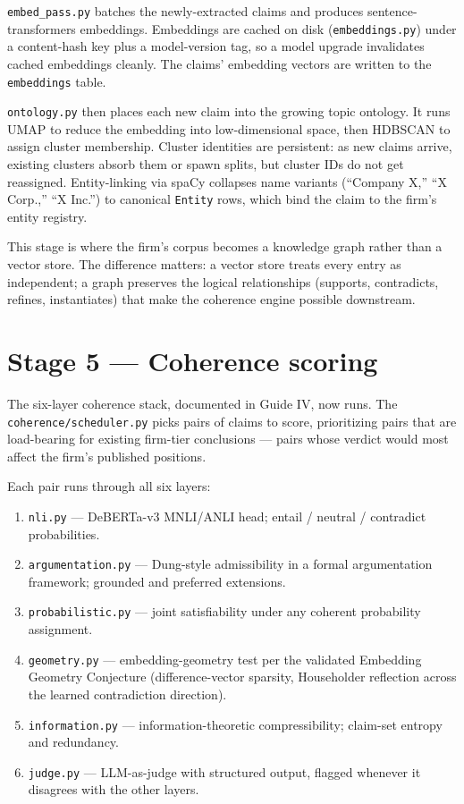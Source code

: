 \documentclass[11pt,letterpaper]{article}
\newcommand{\file}[1]{\texttt{#1}}
\begin{document}
\file{embed\_pass.py} batches the newly-extracted claims and produces sentence-transformers embeddings. Embeddings are cached on disk (\file{embeddings.py}) under a content-hash key plus a model-version tag, so a model upgrade invalidates cached embeddings cleanly. The claims' embedding vectors are written to the \texttt{embeddings} table.

\file{ontology.py} then places each new claim into the growing topic ontology. It runs UMAP to reduce the embedding into low-dimensional space, then HDBSCAN to assign cluster membership. Cluster identities are persistent: as new claims arrive, existing clusters absorb them or spawn splits, but cluster IDs do not get reassigned. Entity-linking via spaCy collapses name variants (``Company X,'' ``X Corp.,'' ``X Inc.'') to canonical \texttt{Entity} rows, which bind the claim to the firm's entity registry.

This stage is where the firm's corpus becomes a knowledge graph rather than a vector store. The difference matters: a vector store treats every entry as independent; a graph preserves the logical relationships (supports, contradicts, refines, instantiates) that make the coherence engine possible downstream.

\section{Stage 5 --- Coherence scoring}

The six-layer coherence stack, documented in Guide IV, now runs. The \file{coherence/scheduler.py} picks pairs of claims to score, prioritizing pairs that are load-bearing for existing firm-tier conclusions --- pairs whose verdict would most affect the firm's published positions.

Each pair runs through all six layers:

\begin{enumerate}[leftmargin=1.5em,itemsep=0.15em]
\item \texttt{nli.py} --- DeBERTa-v3 MNLI/ANLI head; entail / neutral / contradict probabilities.
\item \texttt{argumentation.py} --- Dung-style admissibility in a formal argumentation framework; grounded and preferred extensions.
\item \texttt{probabilistic.py} --- joint satisfiability under any coherent probability assignment.
\item \texttt{geometry.py} --- embedding-geometry test per the validated Embedding Geometry Conjecture (difference-vector sparsity, Householder reflection across the learned contradiction direction).
\item \texttt{information.py} --- information-theoretic compressibility; claim-set entropy and redundancy.
\item \texttt{judge.py} --- LLM-as-judge with structured output, flagged whenever it disagrees with the other layers.
\end{enumerate}
\end{document}
